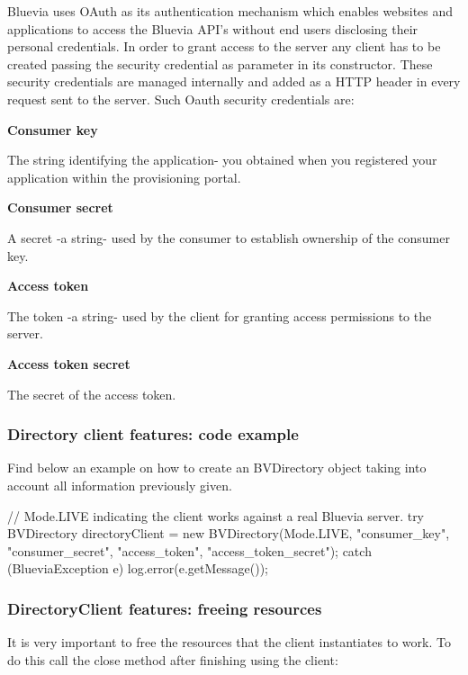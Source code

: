 Bluevia uses OAuth as its authentication mechanism which enables websites and applications to access the Bluevia API's without end users disclosing their personal credentials. In order to grant access to the server any client has to be created passing the security credential as parameter in its constructor. These security credentials are managed internally and added as a HTTP header in every request sent to the server. Such Oauth security credentials are: 
\begin{DoxyItemize}
\item {\bfseries Consumer key} \par
The string identifying the application-\/ you obtained when you registered your application within the provisioning portal.


\item {\bfseries Consumer secret} \par
A secret -\/a string-\/ used by the consumer to establish ownership of the consumer key.


\item {\bfseries Access token} \par
The token -\/a string-\/ used by the client for granting access permissions to the server.


\item {\bfseries Access token secret} \par
The secret of the access token. 
\end{DoxyItemize}\hypertarget{blv_directory_guide_directoryclient_features_code_example}{}\subsubsection{Directory client features: code example}\label{blv_directory_guide_directoryclient_features_code_example}
Find below an example on how to create an BVDirectory object taking into account all information previously given.


\begin{DoxyCode}
// Mode.LIVE indicating the client works against a real Bluevia server.
try {
        BVDirectory directoryClient = new BVDirectory(Mode.LIVE, "consumer_key", 
      "consumer_secret", "access_token", "access_token_secret");
} catch (BlueviaException e){
        log.error(e.getMessage());
}
\end{DoxyCode}
\hypertarget{blv_directory_guide_directoryclient_features_freeing_resources_sec}{}\subsubsection{DirectoryClient features: freeing resources}\label{blv_directory_guide_directoryclient_features_freeing_resources_sec}
It is very important to free the resources that the client instantiates to work. To do this call the close method after finishing using the client:


